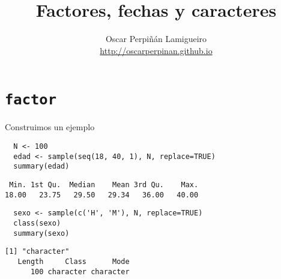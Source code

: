 \documentclass[xcolor={usenames,svgnames,dvipsnames}]{beamer}
\author{Oscar Perpiñán Lamigueiro \\ \url{http://oscarperpinan.github.io}}
\date{}
\title{Factores, fechas y caracteres}
\begin{document}
\maketitle


\section{\texttt{factor}}
\label{sec-1}
\begin{frame}[fragile,label=sec-1-1]{Construimos un ejemplo}
 \lstset{language=R,label= ,caption= ,numbers=none}
\begin{lstlisting}
  N <- 100
  edad <- sample(seq(18, 40, 1), N, replace=TRUE)
  summary(edad)
\end{lstlisting}

\begin{verbatim}
 Min. 1st Qu.  Median    Mean 3rd Qu.    Max. 
18.00   23.75   29.50   29.34   36.00   40.00
\end{verbatim}

\lstset{language=R,label= ,caption= ,numbers=none}
\begin{lstlisting}
  sexo <- sample(c('H', 'M'), N, replace=TRUE)
  class(sexo)
  summary(sexo)
\end{lstlisting}

\begin{verbatim}
[1] "character"
   Length     Class      Mode 
      100 character character
\end{verbatim}
\end{frame}
\end{document}
